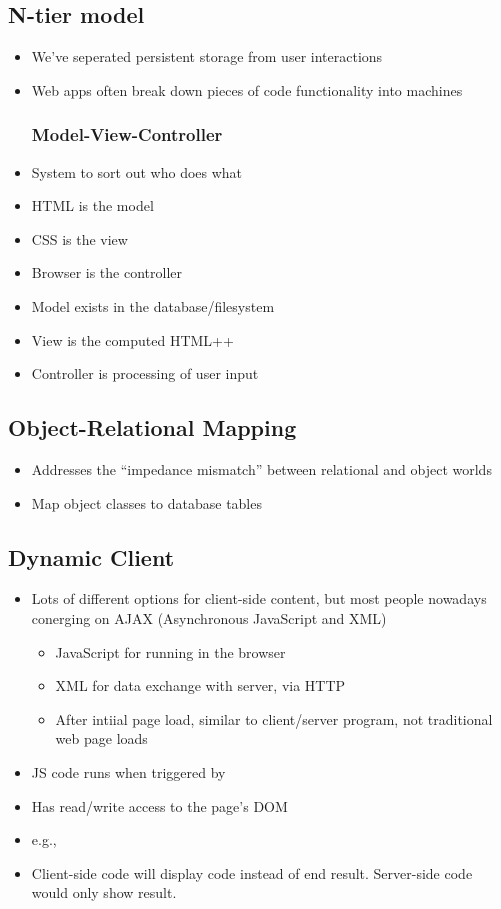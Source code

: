 \subsection{N-tier model}
\begin{itemize}
	\item We've seperated persistent storage from user interactions
	\item Web apps often break down pieces of code functionality into machines
	\subsubsection{Model-View-Controller}
	\item System to sort out who does what
	\item HTML is the model
	\item CSS is the view
	\item Browser is the controller
	\item Model exists in the database/filesystem
	\item View is the computed HTML++
	\item Controller is processing of user input
\end{itemize}

\subsection{Object-Relational Mapping}
\begin{itemize}
	\item Addresses the ``impedance mismatch'' between relational and object worlds
	\item Map object classes to database tables
\end{itemize}

\subsection{Dynamic Client}
\begin{itemize}
	\item Lots of different options for client-side content, but most people nowadays conerging on AJAX (Asynchronous JavaScript and XML)
	\begin{itemize}
		\item JavaScript for running in the browser
		\item XML for data exchange with server, via HTTP
		\item After intiial page load, similar to client/server program, not traditional web page loads
	\end{itemize}
	\item JS code runs when triggered by %
	\item Has read/write access to the page's DOM
	\item e.g.,
	\item Client-side code will display code instead of end result. Server-side code would only show result.
\end{itemize}

